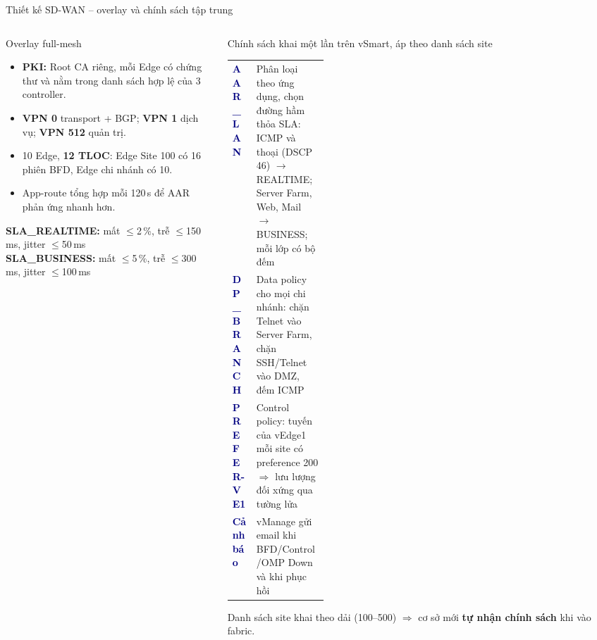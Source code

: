 \documentclass[aspectratio=169, 10pt, xcolor={table}]{beamer}
\renewcommand{\arraystretch}{1.25}
\newcommand{\hd}[1]{\textcolor{navy}{\textbf{#1}}}
\newcommand{\compactlist}{\setlength{\itemsep}{1pt}\setlength{\parskip}{0pt}}
\begin{document}
\begin{frame}{Thiết kế SD-WAN -- overlay và chính sách tập trung}
    \begin{columns}[T]
        \begin{column}{0.40\textwidth}
            \begin{card}{Overlay full-mesh}
                \scriptsize
                \begin{itemize}\compactlist
                    \item \textbf{PKI:} Root CA riêng, mỗi Edge có chứng thư và nằm trong danh sách hợp lệ của 3 controller.
                    \item \textbf{VPN 0} transport + BGP; \textbf{VPN 1} dịch vụ; \textbf{VPN 512} quản trị.
                    \item 10 Edge, \textbf{12 TLOC}: Edge Site 100 có 16 phiên BFD, Edge chi nhánh có 10.
                    \item App-route tổng hợp mỗi 120\,s để AAR phản ứng nhanh hơn.
                \end{itemize}
            \end{card}
            \begin{softcard}\scriptsize
                \textbf{SLA\_REALTIME:} mất $\le$2\,\%, trễ $\le$150\,ms, jitter $\le$50\,ms\\
                \textbf{SLA\_BUSINESS:} mất $\le$5\,\%, trễ $\le$300\,ms, jitter $\le$100\,ms
            \end{softcard}
        \end{column}
        \begin{column}{0.58\textwidth}
            \begin{card}[accent]{Chính sách khai một lần trên vSmart, áp theo danh sách site}
                \scriptsize
                \renewcommand{\arraystretch}{1.12}
                \begin{tabularx}{\linewidth}{@{}L{0.25\linewidth}Y@{}}
                    \hd{AAR\_LAN} & Phân loại theo ứng dụng, chọn đường hầm thỏa SLA: ICMP và thoại (DSCP 46) $\rightarrow$ REALTIME; Server Farm, Web, Mail $\rightarrow$ BUSINESS; mỗi lớp có bộ đếm \\
                    \hd{DP\_BRANCH} & Data policy cho mọi chi nhánh: chặn Telnet vào Server Farm, chặn SSH/Telnet vào DMZ, đếm ICMP \\
                    \hd{PREFER-VE1} & Control policy: tuyến của vEdge1 mỗi site có preference 200 $\Rightarrow$ lưu lượng đối xứng qua tường lửa \\
                    \hd{Cảnh báo} & vManage gửi email khi BFD/Control/OMP Down và khi phục hồi \\
                \end{tabularx}
            \end{card}
            \begin{softcard}[okSoft]\scriptsize
                Danh sách site khai theo dải (100--500) $\Rightarrow$ cơ sở mới \textbf{tự nhận chính sách} khi vào fabric.
            \end{softcard}
        \end{column}
    \end{columns}
\end{frame}
\end{document}
